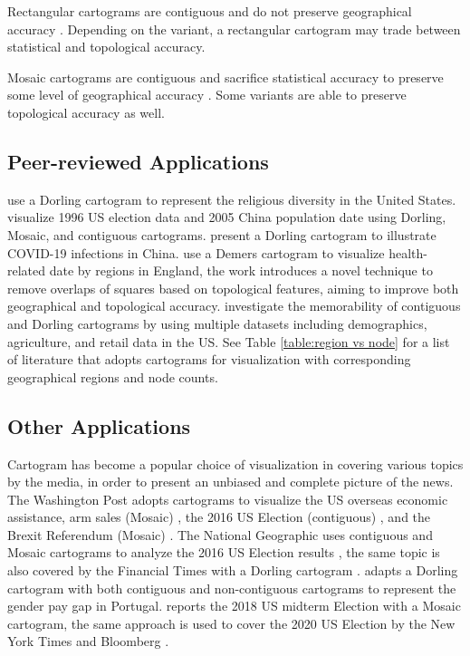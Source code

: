 Rectangular cartograms are contiguous and do not preserve geographical accuracy \cite{raisz1934Rectangular}. Depending on the variant, a rectangular cartogram may trade between statistical and topological accuracy.

Mosaic cartograms are contiguous and sacrifice statistical accuracy to preserve some level of geographical accuracy \cite{cano2015Mosaic}. Some variants are able to preserve topological accuracy as well.

\subsection{Peer-reviewed Applications}

 use a Dorling cartogram to represent the religious diversity in the United States.  visualize 1996 US election data and 2005 China population date using Dorling, Mosaic, and contiguous cartograms.  present a Dorling cartogram to illustrate COVID-19 infections in China.  use a Demers cartogram to visualize health-related date by regions in England, the work introduces a novel technique to remove overlaps of squares based on topological features, aiming to improve both geographical and topological accuracy.  investigate the memorability of contiguous and Dorling cartograms by using multiple datasets including demographics, agriculture, and retail data in the US. See Table \ref{table:region vs node} for a list of literature that adopts cartograms for visualization with corresponding geographical regions and node counts.


\subsection{Other Applications}

Cartogram has become a popular choice of visualization in covering various topics by the media, in order to present an unbiased and complete picture of the news. The Washington Post adopts cartograms to visualize the US overseas economic assistance, arm sales (Mosaic) \cite{bearak2016Everything}, the 2016 US Election (contiguous) \cite{gamio2016Election}, and the Brexit Referendum (Mosaic) \cite{taylor2016What}. The National Geographic uses contiguous and Mosaic cartograms to analyze the 2016 US Election results \cite{miller2016Election}, the same topic is also covered by the Financial Times with a Dorling cartogram \cite{stabe2016Search}. \cite{cruz2017Adapted} adapts a Dorling cartogram with both contiguous and non-contiguous cartograms to represent the gender pay gap in Portugal.  reports the 2018 US midterm Election with a Mosaic cartogram, the same approach is used to cover the 2020 US Election by the New York Times \cite{thelearningnetwork2020What} and Bloomberg \cite{mccartney20202020}.

